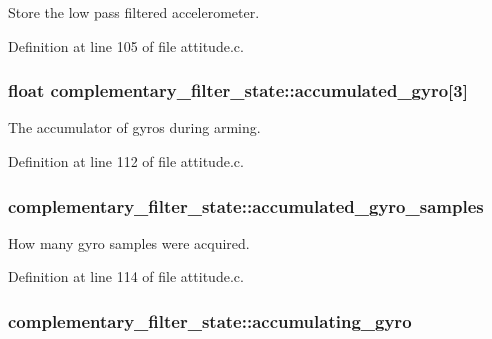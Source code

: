 Store the low pass filtered accelerometer. 



Definition at line 105 of file attitude.\-c.

\hypertarget{structcomplementary__filter__state_ada568dc8edca423fd6744e58049272e9}{
\subsubsection[{accumulated\-\_\-gyro}]{\setlength{\rightskip}{0pt plus 5cm}float complementary\-\_\-filter\-\_\-state\-::accumulated\-\_\-gyro\mbox{[}3\mbox{]}}}\label{structcomplementary__filter__state_ada568dc8edca423fd6744e58049272e9}


The accumulator of gyros during arming. 



Definition at line 112 of file attitude.\-c.

\hypertarget{structcomplementary__filter__state_ae32da25bd01d785b59379dea487222dc}{
\subsubsection[{accumulated\-\_\-gyro\-\_\-samples}]{ complementary\-\_\-filter\-\_\-state\-::accumulated\-\_\-gyro\-\_\-samples}}\label{structcomplementary__filter__state_ae32da25bd01d785b59379dea487222dc}


How many gyro samples were acquired. 



Definition at line 114 of file attitude.\-c.

\hypertarget{structcomplementary__filter__state_a0a5740a2b1f2c69d56ee1c5d4ace3d20}{
\subsubsection[{accumulating\-\_\-gyro}]{ complementary\-\_\-filter\-\_\-state\-::accumulating\-\_\-gyro}}\label{structcomplementary__filter__state_a0a5740a2b1f2c69d56ee1c5d4ace3d20}


